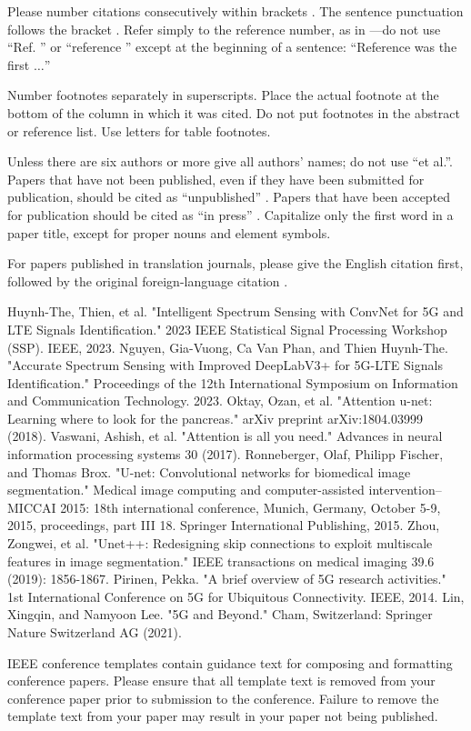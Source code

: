 \documentclass[journal]{IEEEtran} %
\begin{document}
Please number citations consecutively within brackets \cite{b1}. The
sentence punctuation follows the bracket \cite{b2}. Refer simply to the reference
number, as in \cite{b3}---do not use ``Ref. \cite{b3}'' or ``reference \cite{b3}'' except at
the beginning of a sentence: ``Reference \cite{b3} was the first $\ldots$''

Number footnotes separately in superscripts. Place the actual footnote at
the bottom of the column in which it was cited. Do not put footnotes in the
abstract or reference list. Use letters for table footnotes.

Unless there are six authors or more give all authors' names; do not use
``et al.''. Papers that have not been published, even if they have been
submitted for publication, should be cited as ``unpublished'' \cite{b4}. Papers
that have been accepted for publication should be cited as ``in press'' \cite{b5}.
Capitalize only the first word in a paper title, except for proper nouns and
element symbols.

For papers published in translation journals, please give the English
citation first, followed by the original foreign-language citation \cite{b6}.

\begin{thebibliography}{00}
     {Huynh-The, Thien, et al. "Intelligent Spectrum Sensing with ConvNet for 5G and LTE Signals Identification." 2023 IEEE Statistical Signal Processing Workshop (SSP). IEEE, 2023.}
     {Nguyen, Gia-Vuong, Ca Van Phan, and Thien Huynh-The. "Accurate Spectrum Sensing with Improved DeepLabV3+ for 5G-LTE Signals Identification." Proceedings of the 12th International Symposium on Information and Communication Technology. 2023.}
     {Oktay, Ozan, et al. "Attention u-net: Learning where to look for the pancreas." arXiv preprint arXiv:1804.03999 (2018).}
     {Vaswani, Ashish, et al. "Attention is all you need." Advances in neural information processing systems 30 (2017).}
     {Ronneberger, Olaf, Philipp Fischer, and Thomas Brox. "U-net: Convolutional networks for biomedical image segmentation." Medical image computing and computer-assisted intervention–MICCAI 2015: 18th international conference, Munich, Germany, October 5-9, 2015, proceedings, part III 18. Springer International Publishing, 2015.}
     {Zhou, Zongwei, et al. "Unet++: Redesigning skip connections to exploit multiscale features in image segmentation." IEEE transactions on medical imaging 39.6 (2019): 1856-1867.}
     {Pirinen, Pekka. "A brief overview of 5G research activities." 1st International Conference on 5G for Ubiquitous Connectivity. IEEE, 2014.}
     {Lin, Xingqin, and Namyoon Lee. "5G and Beyond." Cham, Switzerland: Springer Nature Switzerland AG (2021).}
\end{thebibliography}
\vspace{12pt}
\color{red}
IEEE conference templates contain guidance text for composing and formatting conference papers. Please ensure that all template text is removed from your conference paper prior to submission to the conference. Failure to remove the template text from your paper may result in your paper not being published.
\end{document}

